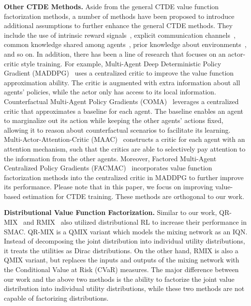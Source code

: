 \documentclass[twoside,11pt]{article}
\newcounter{example0}
\begin{document}
\textbf{Other CTDE Methods.} Aside from the general CTDE value function factorization methods, a number of methods have been proposed to introduce additional assumptions to further enhance the general CTDE methods. They include the use of intrinsic reward signals~\citep{Du2019LIIR}, explicit communication channels~\citep{Zhang2019VBN,Wang2019NDQ}, common knowledge shared among agents~\citep{De2019MACKRL,Wang2020ROMA}, prior knowledge about environments~\citep{Wang2020ASN}, and so on. In addition, there has been a line of research that focuses on an actor-critic style training. For example, Multi-Agent Deep Deterministic Policy Gradient (MADDPG)~\citep{Lowe2017MADDPG} uses a centralized critic to improve the value function approximation ability. The critic is augmented with extra information about all agents' policies, while the actor only has access to its local information. Counterfactual Multi-Agent Policy Gradients (COMA)~\citep{Foerster2018COMA} leverages a centralized critic that approximates a baseline for each agent. The baseline enables an agent to marginalize out its action while keeping the other agents' actions fixed, allowing it to reason about counterfactual scenarios to facilitate its learning. Multi-Actor-Attention-Critic (MAAC)~\citep{Iqbal2019MAAC} constructs a critic for each agent with an attention mechanism, such that the critics are able to selectively pay attention to the information from the other agents. Moreover, Factored Multi-Agent Centralized Policy Gradients (FACMAC)~\citep{Peng2021FACMAC} incorporates value function factorization methods into the centralized critic in MADDPG to further improve its performance. Please note that in this paper, we focus on improving value-based estimation for CTDE training. These methods are orthogonal to our work.

\textbf{Distributional Value Function Factorization.} Similar to our work, QR-MIX~\citep{Hu2020QRMIX} and RMIX~\citep{Anonymous2020RMIX} also utilized distributional RL to increase their performance in SMAC. QR-MIX is a QMIX variant which models the mixing network as an IQN. Instead of decomposing the joint distribution into individual utility distributions, it treats the utilities as Dirac distributions. On the other hand, RMIX is also a QMIX variant, but replaces the inputs and outputs of the mixing network with the Conditional Value at Risk (CVaR) measures. The major difference between our work and the above two methods is the ability to factorize the joint value distribution into individual utility distributions, while these two methods are not capable of factorizing distributions.
\end{document}
